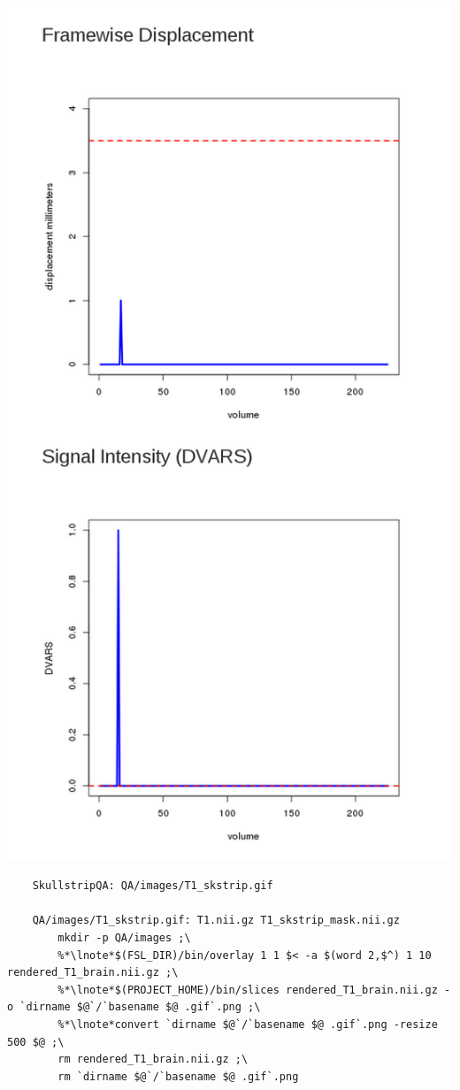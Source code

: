 \includegraphics[scale=0.3]{images/QAmotion2.png}

\begin{lstlisting}
	SkullstripQA: QA/images/T1_skstrip.gif

	QA/images/T1_skstrip.gif: T1.nii.gz T1_skstrip_mask.nii.gz
		mkdir -p QA/images ;\
		%*\lnote*$(FSL_DIR)/bin/overlay 1 1 $< -a $(word 2,$^) 1 10 rendered_T1_brain.nii.gz ;\
		%*\lnote*$(PROJECT_HOME)/bin/slices rendered_T1_brain.nii.gz -o `dirname $@`/`basename $@ .gif`.png ;\
		%*\lnote*convert `dirname $@`/`basename $@ .gif`.png -resize 500 $@ ;\
		rm rendered_T1_brain.nii.gz ;\
		rm `dirname $@`/`basename $@ .gif`.png

\end{lstlisting}


